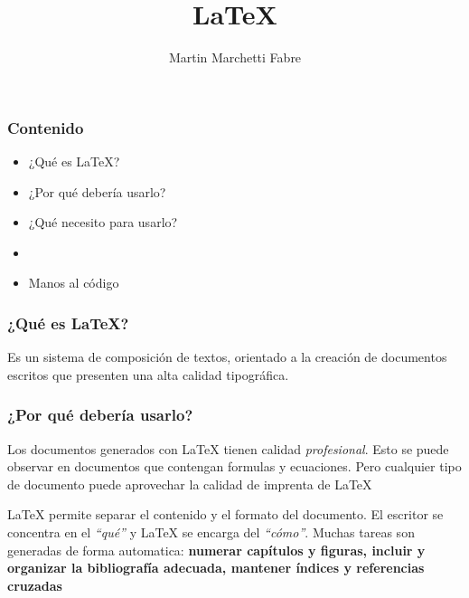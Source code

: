 \documentclass[12pt]{beamer}
\title{\textrm{\LaTeX}}
\author{Martin Marchetti Fabre}
\begin{document}
\frame{\titlepage}


\begin{frame}%
  \frametitle{Contenido}
  \begin{itemize}
    \item<2-> ¿Qué es \textrm{\LaTeX}?
    \item<3-> ¿Por qué debería usarlo?
    \item<4-> ¿Qué necesito para usarlo?
    \item<5-> 
    \item<7> Manos al código
    \end{itemize}
\end{frame}

\begin{frame}[c]
  \frametitle{¿Qué es \textrm{\LaTeX}?}

  \begin{block}{}
    Es un sistema de composición de textos, orientado a la creación de documentos escritos que presenten una alta calidad tipográfica.
  \end{block}


\end{frame}


\begin{frame}%
  \frametitle{¿Por qué debería usarlo?}
  \pause
  \begin{block}{}
    Los documentos generados con \textrm{\LaTeX{}} tienen calidad \textit{profesional}. Esto se puede observar en documentos que contengan formulas y ecuaciones. Pero cualquier tipo de documento puede aprovechar la calidad de imprenta de \textrm{\LaTeX{}}
  \end{block}\pause
  \begin{block}{}
    \textrm{\LaTeX{}} permite separar el contenido y el formato del documento. El escritor se concentra en el \textit{``qué''} y \textrm{\LaTeX{}} se encarga del \textit{``cómo''}. Muchas tareas son generadas de forma automatica: \textbf{numerar capítulos y figuras, incluir y organizar la bibliografía adecuada, mantener índices y referencias cruzadas}
  \end{block}
\end{frame}
\end{document}
